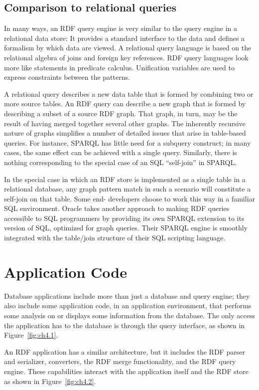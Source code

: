 \subsection{Comparison to relational queries}

In many ways, an RDF query engine is very similar to the query engine in
a relational data store: It provides a standard interface to the data
and defines a formalism by which data are viewed. A relational query
language is based on the relational algebra of joins and foreign key
references. RDF query languages look more like statements in predicate
calculus. Unification variables are used to express constraints between
the patterns.

A relational query describes a new data table that is formed by
combining two or more source tables. An RDF query can describe a new
graph that is formed by describing a subset of a source RDF graph. That
graph, in turn, may be the result of having merged together several
other graphs. The inherently recursive nature of graphs simplifies a
number of detailed issues that arise in table-based queries. For
instance, SPARQL has little need for a subquery construct; in many
cases, the same effect can be achieved with a single query. Similarly,
there is nothing corresponding to the special case of an SQL
``self-join'' in SPARQL.

In the special case in which an RDF store is implemented as a single
table in a relational database, any graph pattern match in such a
scenario will constitute a self-join on that table. Some end- developers
choose to work this way in a familiar SQL environment. Oracle takes
another approach to making RDF queries accessible to SQL programmers by
providing its own SPARQL extension to its version of SQL, optimized for
graph queries. Their SPARQL engine is smoothly integrated with the
table/join structure of their SQL scripting language.

\section{Application Code}

Database applications include more than just a database and query
engine; they also include some application code, in an application
environment, that performs some analysis on or displays some information
from the database. The only access the application has to the database
is through the query interface, as shown in Figure~\ref{fig:ch4.1}.

An RDF application has a similar architecture, but it includes the RDF
parser and serializer, converters, the RDF merge functionality, and the
RDF query engine. These capabilities interact with the application
itself and the RDF store as shown in Figure~\ref{fig:ch4.2}.

